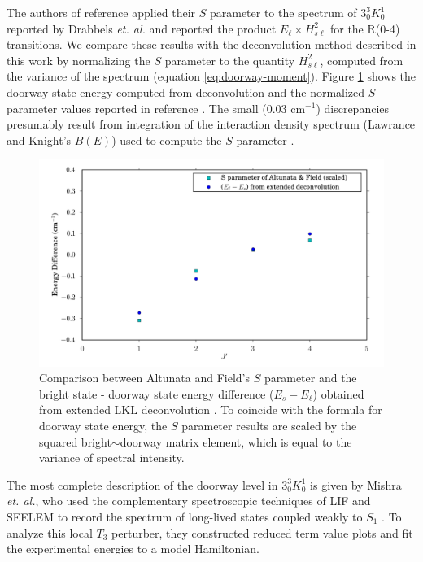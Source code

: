The authors of reference \cite{altunata01} applied their $S$ parameter
to the spectrum of $3^3_0K^1_0$ reported by Drabbels \emph{et. al.}
and reported the product $E_{\ell} \times H_{s\ell}^2$ for the R(0-4)
transitions.  We compare these results with the deconvolution method
described in this work by normalizing the $S$ parameter to the
quantity $H_{s\ell}^2$, computed from the variance of the spectrum
(equation \ref{eq:doorway-moment}).  Figure \ref{fig:selen-comparison}
shows the doorway state energy computed from deconvolution and the
normalized $S$ parameter values reported in reference
\cite{altunata01}.  The small (0.03 cm$^{-1}$) discrepancies
presumably result from integration of the interaction density spectrum
(Lawrance and Knight's $B(E)$) used to compute the $S$ parameter
\cite{lawrance85}.

\begin{figure}
  \caption{Comparison between Altunata and Field's $S$ parameter and
    the bright state - doorway state energy difference ($E_s -
    E_{\ell}$) obtained from extended LKL deconvolution
    \cite{altunata01}.  To coincide with the formula for doorway state
    energy, the $S$ parameter results are scaled by the squared
    bright$\sim$doorway matrix element, which is equal to the variance
    of spectral intensity.}
  \label{fig:selen-comparison}
  \centering
  \includegraphics[width=6.5in]{selen-comparison.png}
\end{figure}

The most complete description of the doorway level in $3^3_0K^1_0$ is
given by Mishra \emph{et. al.}, who used the complementary
spectroscopic techniques of LIF and SEELEM to record the spectrum of
long-lived states coupled weakly to $S_1$ \cite{mishra04}.  To analyze
this local $T_3$ perturber, they constructed reduced term value plots
and fit the experimental energies to a model Hamiltonian.

